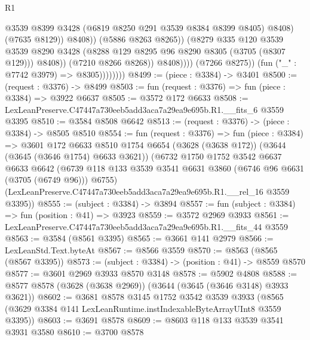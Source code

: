 \begin{lexlean}{R1}
\begin{coremodule}
                                          @3539
                                          @8399
                                          @3428
                                          (@6819 @8250 @291 @3539 @8384 @8399 @8405)
                                          @8408)
                                        (@7635 @8129))
                                      @8408))
                                  (@5886 @8263 @8265))
                                (@8279
                                  @335
                                  @120
                                  @3539
                                  @3539
                                  @8290
                                  @3428
                                  (@8288 @129 @8295 @96 @8290 @8305 (@3705 (@8307 @129)))
                                  @8408))
                              (@7210 @8266 @8268))
                            @8408))))
                    (@7266 @8275))
                  (fun ("_" : @7742 @3979) => @8305))))))))
@8499 := (piece : @3384) -> @3401
@8500 := (request : @3376) -> @8499
@8503 := fun (request : @3376) => fun (piece : @3384) => @3922 @6637
@8505 := @3572 @172 @6633
@8508 := LexLeanPreserve.C47447a730eeb5add3aca7a29ea9e695b.R1.__fits_6 @3559 @3395
@8510 := @3584 @8508 @6642
@8513 := (request : @3376) -> (piece : @3384) -> @8505 @8510
@8554 := fun (request : @3376) =>
  fun (piece : @3384) =>
  @3601
    @172
    @6633
    @8510
    @1754
    @6654
    (@3628 (@3638 @172))
    (@3644 (@3645 (@3646 @1754) @6633 @3621))
    (@6732
      @1750
      @1752
      @3542
      @6637
      @6633
      @6642
      (@6739 @118 @133 @3539 @3541 @6631 @3860 (@6746 @96 @6631 (@3705 (@6749 @96))) @6755)
      (LexLeanPreserve.C47447a730eeb5add3aca7a29ea9e695b.R1.__rel_16 @3559 @3395))
@8555 := (subject : @3384) -> @3894
@8557 := fun (subject : @3384) => fun (position : @41) => @3923
@8559 := @3572 @2969 @3933
@8561 := LexLeanPreserve.C47447a730eeb5add3aca7a29ea9e695b.R1.__fits_44 @3559
@8563 := @3584 (@8561 @3395)
@8565 := @3661 @141 @2979
@8566 := LexLeanStd.Text.byteAt
@8567 := @8566 @3559
@8570 := @8563 (@8565 (@8567 @3395))
@8573 := (subject : @3384) -> (position : @41) -> @8559 @8570
@8577 := @3601 @2969 @3933 @8570 @3148
@8578 := @5902 @4808
@8588 := @8577 @8578 (@3628 (@3638 @2969)) (@3644 (@3645 (@3646 @3148) @3933 @3621))
@8602 := @3681
    @8578
    @3145
    @1752
    @3542
    @3539
    @3933
    (@8565 (@3629 @3384 @141 LexLeanRuntime.instIndexableByteArrayUInt8 @3559 @3395))
@8603 := @3691 @8578
@8609 := @8603 @118 @133 @3539 @3541 @3931 @3580
@8610 := @3700 @8578

\end{coremodule}
\end{lexlean}
